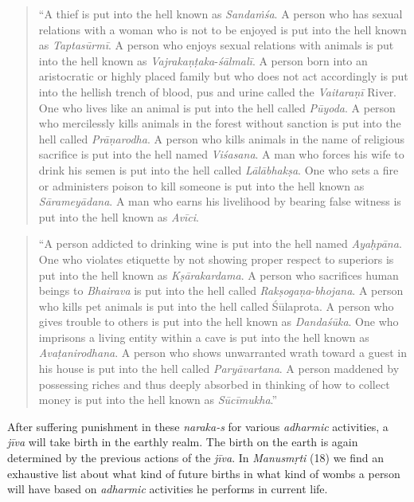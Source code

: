 \begin{quote}
``A thief is put into the hell known as \emph{Sandaṁśa}. A person who has sexual relations with a woman who is not to be enjoyed is put into the hell known as \emph{Taptasūrmī}. A person who enjoys sexual relations with animals is put into the hell known as \emph{Vajrakaṇṭaka}-\emph{śālmalī}. A person born into an aristocratic or highly placed family but who does not act accordingly is put into the hellish trench of blood, pus and urine called the \emph{Vaitaraṇī} River. One who lives like an animal is put into the hell called \emph{Pūyoda}. A person who mercilessly kills animals in the forest without sanction is put into the hell called \emph{Prāṇarodha}. A person who kills animals in the name of religious sacrifice is put into the hell named \emph{Viśasana}. A man who forces his wife to drink his semen is put into the hell called \emph{Lālābhakṣa}. One who sets a fire or administers poison to kill someone is put into the hell known as \emph{Sārameyādana}. A man who earns his livelihood by bearing false witness is put into the hell known as \emph{Avīci}.
\end{quote}

\begin{quote}
``A person addicted to drinking wine is put into the hell named \emph{Ayaḥpāna}. One who violates etiquette by not showing proper respect to superiors is put into the hell known as \emph{Kṣārakardama}. A person who sacrifices human beings to \emph{Bhairava} is put into the hell called \emph{Rakṣogaṇa}-\emph{bhojana}. A person who kills pet animals is put into the hell called Śūlaprota. A person who gives trouble to others is put into the hell known as \emph{Dandaśūka}. One who imprisons a living entity within a cave is put into the hell known as \emph{Avaṭanirodhana}. A person who shows unwarranted wrath toward a guest in his house is put into the hell called \emph{Paryāvartana}. A person maddened by possessing riches and thus deeply absorbed in thinking of how to collect money is put into the hell known as \emph{Sūcīmukha}.''
\end{quote}

After suffering punishment in these \emph{naraka-s} for various \emph{adharmic} activities, a \emph{jīva} will take birth in the earthly realm. The birth on the earth is again determined by the previous actions of the \emph{jīva}. In \emph{Manusmṛti} (18) we find an exhaustive list about what kind of future births in what kind of wombs a person will have based on \emph{adharmic} activities he performs in current life.

